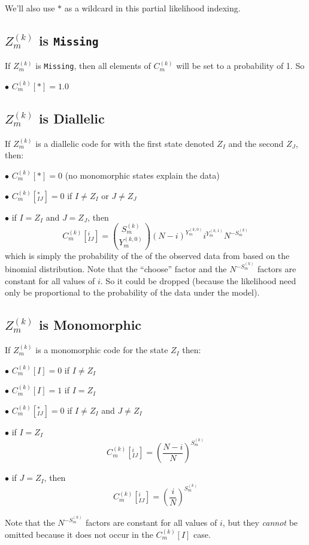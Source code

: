 \documentclass{llncs}
\newcommand{\virtPopSize}{\ensuremath{N}}
\begin{document}
We'll also use $\ast$ as a wildcard in this partial likelihood indexing.

\subsection*{$Z_m^{(k)}$ is \texttt{Missing}}
If $Z_m^{(k)}$ is \texttt{Missing}, then all elements of $C_m^{(k)}$ will be set to a probability of 1. So
\begin{compactitem}
    \item[$\bullet$] $C_m^{(k)}[\ast]=1.0$
\end{compactitem}

\subsection*{$Z_m^{(k)}$ is Diallelic}
If $Z_m^{(k)}$ is a diallelic code for with the first state denoted $Z_I$ and the second $Z_J$, then:
\begin{compactitem}
    \item[$\bullet$] $C_m^{(k)}[*] = 0$  (no monomorphic states explain the data)
    \item[$\bullet$] $C_m^{(k)}[^{\ast}_{IJ}] = 0$  if $I\neq Z_I$ or $J\neq Z_J$
    \item[$\bullet$] if $I = Z_I$ and $J = Z_J$, then
     $$C_m^{(k)}[^{i}_{IJ}] = {S_m^{(k)} \choose Y_m^{(k,0)}} (\virtPopSize - i)^{Y_m^{(k,0)}}i^{Y_m^{(k,1)}} \virtPopSize^{-S_m^{(k)}}$$
     which is simply the probability of the of the observed data from based on the binomial distribution.
     Note that the ``choose'' factor and the $ \virtPopSize^{-S_m^{(k)}}$ factors are constant for all values of $i$. So it could be dropped (because the likelihood need only be proportional to the probability of the data under the model).
\end{compactitem}


\subsection*{$Z_m^{(k)}$ is Monomorphic}
If $Z_m^{(k)}$ is a monomorphic code for the state $Z_I$ then:
\begin{compactitem}
    \item[$\bullet$] $C_m^{(k)}[I] = 0$ if $I\neq Z_I$
    \item[$\bullet$] $C_m^{(k)}[I] = 1$ if $I = Z_I$
    \item[$\bullet$] $C_m^{(k)}[^{\ast}_{IJ}] = 0$  if $I\neq Z_I$ and $J\neq Z_I$
    \item[$\bullet$] if $I = Z_I$
     $$C_m^{(k)}[^{i}_{IJ}] = \left(\frac{\virtPopSize - i}{\virtPopSize}\right)^{S_m^{(k)}}$$
    \item[$\bullet$] if $J = Z_I$, then
        $$C_m^{(k)}[^{i}_{IJ}] = \left(\frac{i}{\virtPopSize}\right)^{S_m^{(k)}}$$
\end{compactitem}
Note that the $ \virtPopSize^{-S_m^{(k)}}$ factors are constant for all values of $i$, but they 
     {\em cannot} be omitted because it does not occur in the $C_m^{(k)}[I]$ case.
\end{document}
